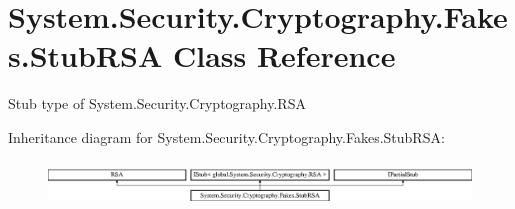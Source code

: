 \hypertarget{class_system_1_1_security_1_1_cryptography_1_1_fakes_1_1_stub_r_s_a}{\section{System.\-Security.\-Cryptography.\-Fakes.\-Stub\-R\-S\-A Class Reference}
\label{class_system_1_1_security_1_1_cryptography_1_1_fakes_1_1_stub_r_s_a}
}


Stub type of System.\-Security.\-Cryptography.\-R\-S\-A 


Inheritance diagram for System.\-Security.\-Cryptography.\-Fakes.\-Stub\-R\-S\-A\-:\begin{figure}[H]
\begin{center}
\leavevmode
\includegraphics[height=1.196581cm]{class_system_1_1_security_1_1_cryptography_1_1_fakes_1_1_stub_r_s_a}
\end{center}
\end{figure}
